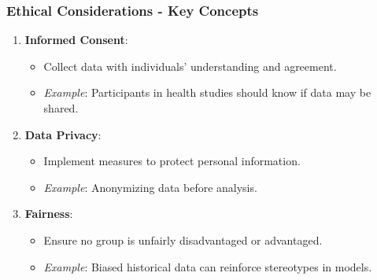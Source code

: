 \documentclass[aspectratio=169]{beamer}
\begin{document}
\begin{frame}[fragile]
    \frametitle{Ethical Considerations - Key Concepts}
    \begin{enumerate}
        \item \textbf{Informed Consent}:
            \begin{itemize}
                \item Collect data with individuals' understanding and agreement.
                \item \textit{Example}: Participants in health studies should know if data may be shared.
            \end{itemize}
            
        \item \textbf{Data Privacy}:
            \begin{itemize}
                \item Implement measures to protect personal information.
                \item \textit{Example}: Anonymizing data before analysis.
            \end{itemize}
        
        \item \textbf{Fairness}:
            \begin{itemize}
                \item Ensure no group is unfairly disadvantaged or advantaged.
                \item \textit{Example}: Biased historical data can reinforce stereotypes in models.
            \end{itemize}
    \end{enumerate}
\end{frame}
\end{document}
